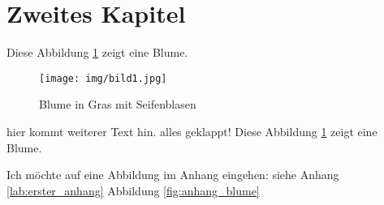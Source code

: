 
\section{Zweites Kapitel}

Diese Abbildung \ref{fig: Blume}  zeigt eine Blume.

\begin{figure}[H]
    \centering
    \texttt{[image: img/bild1.jpg]}
    \caption[Blume]{Blume in Gras mit Seifenblasen}
    \label{fig: Blume}
\end{figure}
hier kommt weiterer Text hin.
alles geklappt!
Diese Abbildung \ref{fig: Blume} zeigt eine Blume.

Ich möchte auf eine Abbildung im Anhang eingehen: siehe Anhang \ref{lab:erster_anhang} Abbildung \ref{fig:anhang_blume} 